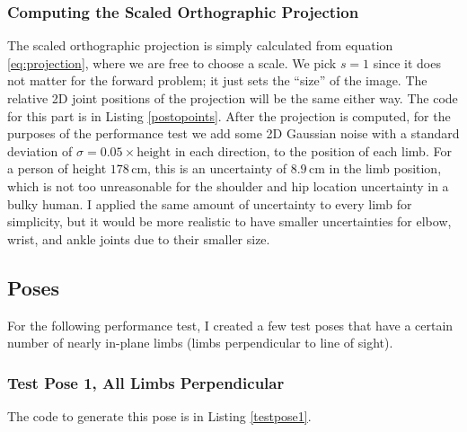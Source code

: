 \documentclass[final]{article}
\newcommand{\trm}[1]{\textrm{#1}}
\newcommand{\uu}[1]{\,\trm{#1}}
\begin{document}
\begin{spacing}{1.1}
\subsubsection{Computing the Scaled Orthographic Projection}

The scaled orthographic projection is simply calculated from equation \ref{eq:projection}, where we are free to choose a scale. We pick $s = 1$ since it does not matter for the forward problem; it just sets the ``size'' of the image. The relative 2D joint positions of the projection will be the same either way. The code for this part is in Listing \ref{postopoints}. After the projection is computed, for the purposes of the performance test we add some 2D Gaussian noise with a standard deviation of $\sigma = 0.05 \times \trm{height}$ in each direction, to the position of each limb. For a person of height $178\uu{cm}$, this is an uncertainty of $8.9\uu{cm}$ in the limb position, which is not too unreasonable for the shoulder and hip location uncertainty in a bulky human. I applied the same amount of uncertainty to every limb for simplicity, but it would be more realistic to have smaller uncertainties for elbow, wrist, and ankle joints due to their smaller size.

\subsection{Poses}

For the following performance test, I created a few test poses that have a certain number of nearly in-plane limbs (limbs perpendicular to line of sight). 

\subsubsection{Test Pose 1, All Limbs Perpendicular}

The code to generate this pose is in Listing \ref{testpose1}. 


\end{spacing}
\end{document}

